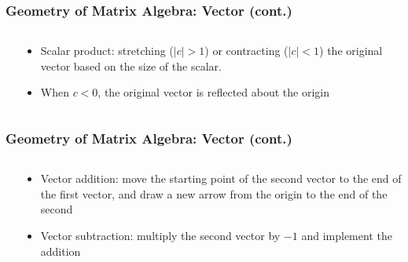 \documentclass[pdflatex, 12pt]{beamer}
\begin{document}
\begin{frame}
\frametitle{Geometry of Matrix Algebra: Vector (cont.)}
\begin{columns}
\begin{column}{0.5\textwidth}
\centering
{}
\end{column}
\begin{column}{0.5\textwidth}
\begin{itemize}
\item Scalar product: stretching ($|c| > 1$) or contracting ($|c| < 1$) the original vector based on the size of the scalar.
\vspace{0.4cm}
\item When $c < 0$, the original vector is reflected about the origin
\end{itemize}
\end{column}
\end{columns}
\end{frame}

\begin{frame}
\frametitle{Geometry of Matrix Algebra: Vector (cont.)}
\begin{columns}
\begin{column}{0.5\textwidth}
\centering
{}
\end{column}
\begin{column}{0.5\textwidth}
\begin{itemize}
\item Vector addition: move the starting point of the second vector to the end of the first vector, and draw a new arrow from the origin to the end of the second
\vspace{0.4cm}
\item Vector subtraction: multiply the second vector by $-1$ and implement the addition
\end{itemize}
\end{column}
\end{columns}
\end{frame}
\end{document}
